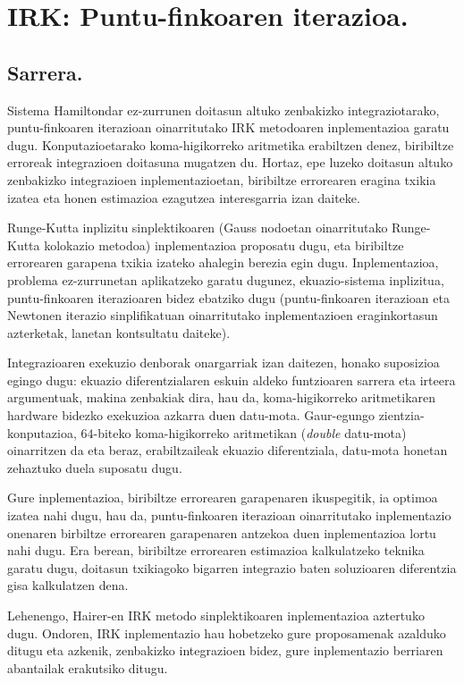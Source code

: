 \chapter{IRK: Puntu-finkoaren iterazioa.}
\label{chap:IRK-PF}

\section{Sarrera.}


Sistema Hamiltondar ez-zurrunen doitasun altuko zenbakizko integraziotarako, puntu-finkoaren iterazioan oinarritutako IRK metodoaren inplementazioa garatu dugu. Konputazioetarako koma-higikorreko aritmetika erabiltzen denez, biribiltze erroreak integrazioen doitasuna mugatzen du. Hortaz, epe luzeko doitasun altuko zenbakizko integrazioen inplementazioetan, biribiltze errorearen eragina txikia izatea eta honen estimazioa ezagutzea interesgarria izan daiteke. 

Runge-Kutta inplizitu sinplektikoaren (Gauss nodoetan oinarritutako Runge-Kutta kolokazio metodoa) inplementazioa proposatu dugu, eta biribiltze errorearen garapena txikia izateko ahalegin berezia egin dugu. Inplementazioa, problema ez-zurrunetan aplikatzeko garatu dugunez, ekuazio-sistema inplizitua, puntu-finkoaren iterazioaren bidez ebatziko dugu (puntu-finkoaren iterazioan eta Newtonen iterazio sinplifikatuan oinarritutako inplementazioen eraginkortasun azterketak, \cite{Hairer2006,JMSanz-Serna1994} lanetan kontsultatu daiteke).

Integrazioaren exekuzio denborak onargarriak izan daitezen, honako suposizioa egingo dugu: ekuazio diferentzialaren eskuin aldeko funtzioaren sarrera eta irteera argumentuak, makina zenbakiak dira, hau da, koma-higikorreko aritmetikaren hardware bidezko exekuzioa azkarra duen datu-mota. Gaur-egungo zientzia-konputazioa,  $64$-biteko koma-higikorreko aritmetikan (\emph{double} datu-mota) oinarritzen da eta beraz, erabiltzaileak ekuazio diferentziala, datu-mota honetan zehaztuko duela suposatu dugu.

Gure inplementazioa, biribiltze errorearen garapenaren ikuspegitik, ia optimoa izatea nahi dugu, hau da, puntu-finkoaren iterazioan oinarritutako inplementazio onenaren birbiltze errorearen garapenaren antzekoa duen inplementazioa lortu nahi dugu. Era berean, biribiltze errorearen estimazioa kalkulatzeko teknika garatu dugu, doitasun txikiagoko bigarren integrazio baten soluzioaren diferentzia gisa kalkulatzen dena. 
 
 
Lehenengo, Hairer-en IRK metodo sinplektikoaren inplementazioa  \cite{Hairer2008} aztertuko dugu. Ondoren, IRK inplementazio hau hobetzeko gure proposamenak azalduko ditugu eta azkenik, zenbakizko integrazioen bidez, gure inplementazio berriaren abantailak erakutsiko ditugu.

